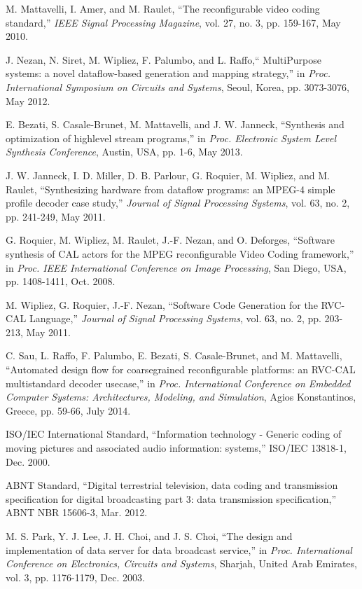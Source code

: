 \begin{thebibliography}{}
M. Mattavelli,  I. Amer, and M. Raulet, ``The reconfigurable video coding standard,'' {\it IEEE Signal Processing Magazine}, vol. 27, no. 3, pp. 159-167, May 2010.

J. Nezan, N. Siret, M. Wipliez, F. Palumbo, and L. Raffo,`` MultiPurpose
systems: a novel dataflow-based generation and mapping strategy,'' in {\it Proc. International Symposium on Circuits and Systems}, Seoul, Korea, pp. 3073-3076, May 2012.

E. Bezati, S. Casale-Brunet, M. Mattavelli, and J. W. Janneck, ``Synthesis and optimization of highlevel stream programs,'' in {\it Proc. Electronic System Level Synthesis Conference}, Austin, USA, pp. 1-6, May 2013.

J. W. Janneck, I. D. Miller, D. B. Parlour, G. Roquier, M. Wipliez, and M. Raulet, ``Synthesizing hardware from dataflow programs: an MPEG-4 simple profile decoder case study,'' {\it Journal of Signal Processing Systems}, vol. 63, no. 2, pp. 241-249, May 2011.

G. Roquier, M. Wipliez, M. Raulet, J.-F. Nezan, and O. Deforges, ``Software synthesis of CAL actors for the MPEG reconfigurable Video Coding framework,'' in {\it Proc. IEEE International Conference on Image Processing}, San Diego, USA, pp. 1408-1411, Oct. 2008.

M. Wipliez, G. Roquier, J.-F. Nezan, ``Software Code Generation for the RVC-CAL Language,'' {\it Journal of Signal Processing Systems}, vol. 63, no. 2, pp. 203-213, May 2011.

C. Sau, L. Raffo, F. Palumbo, E. Bezati, S. Casale-Brunet, and M. Mattavelli, ``Automated design flow for coarsegrained reconfigurable platforms: an RVC-CAL multistandard decoder usecase,'' in {\it Proc. International Conference on Embedded Computer Systems: Architectures, Modeling, and Simulation}, Agios Konstantinos, Greece, pp. 59-66, July 2014.

ISO/IEC International Standard, ``Information technology - Generic coding of moving pictures and associated audio information: systems,'' ISO/IEC 13818-1, Dec. 2000.

ABNT Standard, ``Digital terrestrial television, data coding and transmission specification for digital broadcasting part 3: data transmission specification,'' ABNT NBR 15606-3, Mar. 2012.

M. S. Park, Y. J. Lee, J. H. Choi, and J. S. Choi, ``The design and implementation of data server for data broadcast service,'' in \emph{Proc. International Conference on Electronics, Circuits and Systems}, Sharjah, United Arab Emirates, vol. 3, pp. 1176-1179, Dec. 2003.


\end{thebibliography}
